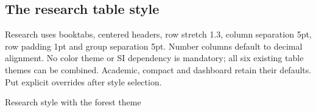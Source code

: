 \subsection{The research table style}
Research uses booktabs, centered headers, row stretch 1.3, column separation
5pt, row padding 1pt and group separation 5pt. Number columns default to decimal
alignment. No color theme or SI dependency is mandatory; all six existing table
themes can be combined. Academic, compact and dashboard retain their defaults.
Put explicit overrides after style selection.
\begin{demo}{Research style with the forest theme}
\begin{center}
\begin{gradtable}[align=c,header align=c,style=research,theme=forest,width=\linewidth,group summary=true]
\end{gradtable}
\end{center}
\end{demo}
